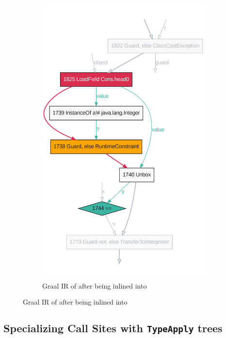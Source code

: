 \begin{figure}
\begin{subfigure}[b]{0.45\textwidth}
		\includegraphics[width=\textwidth]{figures/dot/List.contains.boxed.TruffleTier.png}
		\caption{Graal IR of  after being inlined into }
		\label{graalir:cons-contains-head-focus-boxed}
	\end{subfigure}
	\hfill
\end{figure}

\subsection{Specializing Call Sites with \texttt{TypeApply} trees}

